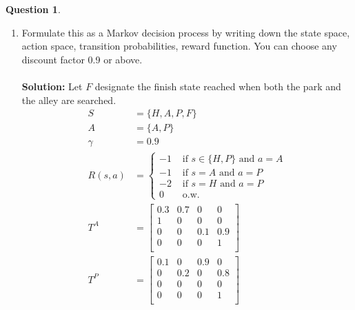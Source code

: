 \documentclass{article}
\theoremstyle{definition}
\newtheorem{question}[thm]{Question}
\begin{document}
\begin{question}
    \begin{enumerate}[label=\alph*)]
        \item Formulate this as a Markov decision process by writing down the state space, action space, transition probabilities, reward function. You can choose any discount factor 0.9 or above.
         \\ \\
        \noindent \textbf{Solution: }
        Let $F$ designate the finish state reached when both the park and the alley are searched.
        \begin{align*}
            S &= \{H,A,P,F\} \\
            A &= \{A,P\}\\
            \gamma &= 0.9\\
            R(s,a) &= 
            \begin{cases}
                -1& \text{ if } s\in\{H,P\}\text{ and } a = A\\
                -1& \text{ if } s = A\text{ and } a = P\\
                -2& \text{ if } s = H\text{ and } a = P\\
                0 & \text{ o.w.}
            \end{cases}\\
            T^A &= \begin{bmatrix}
                            0.3 & 0.7 & 0 & 0\\
                            1 & 0 & 0 & 0\\
                            0 & 0 & 0.1 & 0.9\\
                            0 & 0 & 0 & 1\\
                         \end{bmatrix}\\
             T^P &= \begin{bmatrix}
                            0.1 & 0 & 0.9 & 0\\
                            0 & 0.2 & 0 & 0.8\\
                            0 & 0 & 0 & 0\\
                            0 & 0 & 0 & 1\\
                         \end{bmatrix}\\

\end{align*}
\end{enumerate}
\end{question}
\end{document}
